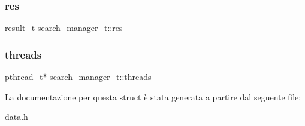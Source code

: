 \subsubsection{\texorpdfstring{res}{res}}
{\footnotesize\ttfamily \hyperlink{structresult__t}{result\+\_\+t} search\+\_\+manager\+\_\+t\+::res}

\mbox{\label{structsearch__manager__t_abac9106caf0478276fc6cf288d30917c}} 
\subsubsection{\texorpdfstring{threads}{threads}}
{\footnotesize\ttfamily pthread\+\_\+t$\ast$ search\+\_\+manager\+\_\+t\+::threads}



La documentazione per questa struct è stata generata a partire dal seguente file\+:\begin{DoxyCompactItemize}
\item 
\hyperlink{data_8h}{data.\+h}\end{DoxyCompactItemize}
